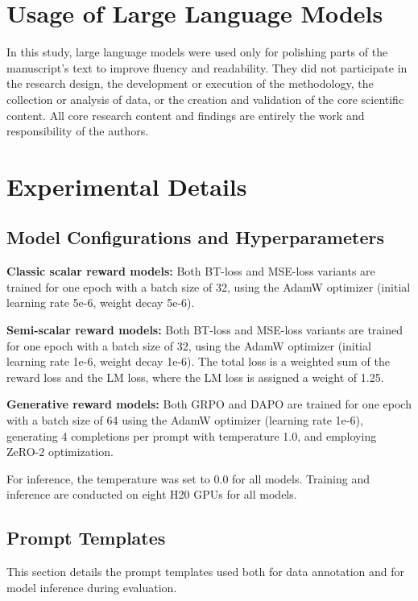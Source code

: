 
\section{Usage of Large Language Models}
In this study, large language models were used only for polishing parts of the manuscript’s text to improve fluency and readability. They did not participate in the research design, the development or execution of the methodology, the collection or analysis of data, or the creation and validation of the core scientific content. All core research content and findings are entirely the work and responsibility of the authors.

\section{Experimental Details}
\label{appendix:Experimental-Details}
\subsection{Model Configurations and Hyperparameters}

\textbf{Classic scalar reward models:} Both BT-loss and MSE-loss variants are trained for one epoch with a batch size of 32, using the AdamW optimizer (initial learning rate 5e-6, weight decay 5e-6).

\textbf{Semi-scalar reward models:} Both BT-loss and MSE-loss variants are trained for one epoch with a batch size of 32, using the AdamW optimizer (initial learning rate 1e-6, weight decay 1e-6). The total loss is a weighted sum of the reward loss and the LM loss, where the LM loss is assigned a weight of 1.25.

\textbf{Generative reward models:} Both GRPO and DAPO are trained for one epoch with a batch size of 64 using the AdamW optimizer (learning rate 1e-6), generating 4 completions per prompt with temperature 1.0, and employing ZeRO-2 optimization.

For inference, the temperature was set to 0.0 for all models. Training and inference are conducted on eight H20 GPUs for all models.

\subsection{Prompt Templates}
This section details the prompt templates used both for data annotation and for model inference during evaluation.

